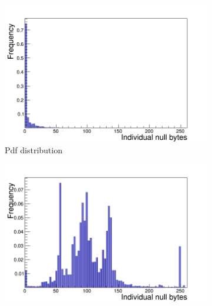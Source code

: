 \begin{figure}[H]
  \begin{subfigure}[b]{.5\linewidth}
    \raggedleft
     \includegraphics[scale=0.33]{./Figures/null_bytes/Indi_Null_Bytes_pdf}
   \caption{Pdf distribution}
    \label{fig:1a}
  \end{subfigure}%
  \begin{subfigure}[b]{.5\linewidth}
    \raggedright
        \includegraphics[scale=0.33]{./Figures/null_bytes/Indi_Null_Bytes_xls}
    \label{fig:1b}
  \end{subfigure}
  

\end{figure}
